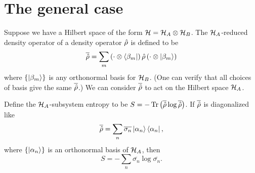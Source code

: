 \section{The general case}

Suppose we have a Hilbert space of the form \(\mathcal{H} = \mathcal{H}_A \otimes \mathcal{H}_B\). The \(\mathcal{H}_A\)-reduced density operator of a density operator \(\hat{\rho}\) is defined to be
\[\overline{\hat{\rho}} = \sum_m \left(\cdot\otimes\left\langle\beta_m\right|\right) \hat{\rho} \left(\cdot\otimes\left|\beta_m\right\rangle\right)\]
where \(\{\left|\beta_m\right\rangle\}\) is any orthonormal basis for \(\mathcal{H}_B\). (One can verify that all choices of basis give the same \(\overline{\hat{\rho}}\).)
We can consider \(\overline{\hat{\rho}}\) to act on the Hilbert space \(\mathcal{H}_A\).

Define the \(\mathcal{H}_A\)-subsystem entropy to be \(S = -\operatorname{Tr}\left(\overline{\hat{\rho}} \log \overline{\hat{\rho}}\right)\). If \(\overline{\hat{\rho}}\) is diagonalized like
\begin{equation}\label{eq.redrhodef}
\overline{\hat{\rho}} = \sum_n \overline{\sigma_n} \left|\alpha_n\right\rangle\left\langle\alpha_n\right|,
\end{equation}
where \(\{\left|\alpha_n\right\rangle\}\) is an orthonormal basis of \(\mathcal{H}_A\), then
\begin{equation}\label{eq.entropydefinition}
S = -\sum_n \overline{\sigma_n} \log \overline{\sigma_n}.
\end{equation}

